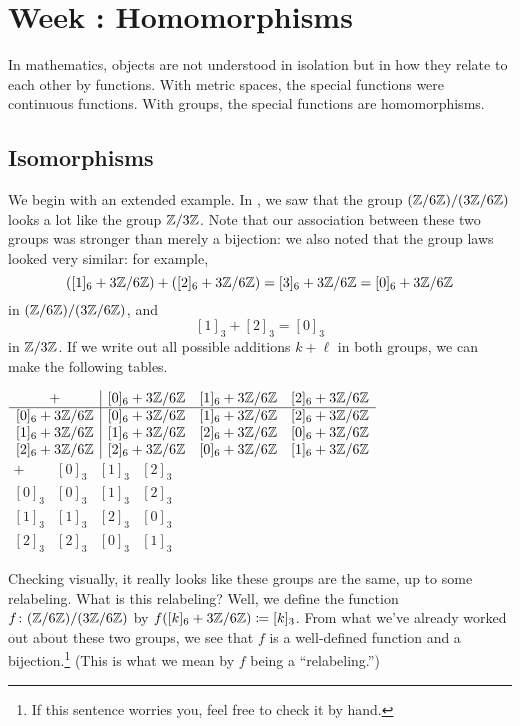 \documentclass[../notes.tex]{subfiles}
\begin{document}
\section{Week \theweek: Homomorphisms}
In mathematics, objects are not understood in isolation but in how they relate to each other by functions. With metric spaces, the special functions were continuous functions. With groups, the special functions are homomorphisms.

\subsection{Isomorphisms}
We begin with an extended example. In , we saw that the group $(\mathbb Z/6\mathbb Z)/(3\mathbb Z/6\mathbb Z)$ looks a lot like the group $\mathbb Z/3\mathbb Z$. Note that our association between these two groups was stronger than merely a bijection: we also noted that the group laws looked very similar: for example,
\[([1]_6+3\mathbb Z/6\mathbb Z)+([2]_6+3\mathbb Z/6\mathbb Z)=[3]_6+3\mathbb Z/6\mathbb Z=[0]_6+3\mathbb Z/6\mathbb Z\]
in $(\mathbb Z/6\mathbb Z)/(3\mathbb Z/6\mathbb Z)$, and
\[[1]_3+[2]_3=[0]_3\]
in $\mathbb Z/3\mathbb Z$. If we write out all possible additions $k+\ell$ in both groups, we can make the following tables.
\begin{center}
    $\begin{array}{c|ccc}
        +               & [0]_6+3\mathbb Z/6\mathbb Z & [1]_6+3\mathbb Z/6\mathbb Z & [2]_6+3\mathbb Z/6\mathbb Z \\\hline
        {}[0]_6+3\mathbb Z/6\mathbb Z & [0]_6+3\mathbb Z/6\mathbb Z & [1]_6+3\mathbb Z/6\mathbb Z & [2]_6+3\mathbb Z/6\mathbb Z \\
        {}[1]_6+3\mathbb Z/6\mathbb Z & [1]_6+3\mathbb Z/6\mathbb Z & [2]_6+3\mathbb Z/6\mathbb Z & [0]_6+3\mathbb Z/6\mathbb Z \\
        {}[2]_6+3\mathbb Z/6\mathbb Z & [2]_6+3\mathbb Z/6\mathbb Z & [0]_6+3\mathbb Z/6\mathbb Z & [1]_6+3\mathbb Z/6\mathbb Z 
    \end{array}$
    \qquad
    $\begin{array}{c|ccc}
        +     & [0]_3 & [1]_3 & [2]_3 \\\hline
        {}[0]_3 & [0]_3 & [1]_3 & [2]_3 \\
        {}[1]_3 & [1]_3 & [2]_3 & [0]_3 \\
        {}[2]_3 & [2]_3 & [0]_3 & [1]_3
    \end{array}$
\end{center}
Checking visually, it really looks like these groups are the same, up to some relabeling. What is this relabeling? Well, we define the function $f\colon(\mathbb Z/6\mathbb Z)/(3\mathbb Z/6\mathbb Z)$ by $f([k]_6+3\mathbb Z/6\mathbb Z)\coloneqq[k]_3$. From what we've already worked out about these two groups, we see that $f$ is a well-defined function and a bijection.\footnote{If this sentence worries you, feel free to check it by hand.} (This is what we mean by $f$ being a ``relabeling.'')
\end{document}
